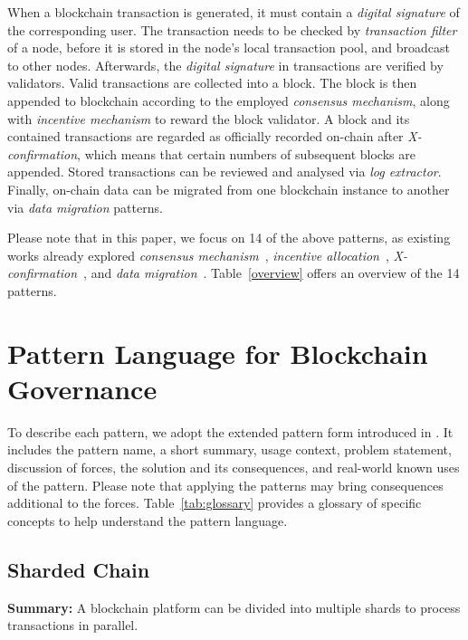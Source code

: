 \documentclass{article}
\begin{document}
When a blockchain transaction is generated, it must contain a \textit{digital signature} of the corresponding user. The transaction needs to be checked by \textit{transaction filter} of a node, before it is stored in the node's local transaction pool, and broadcast to other nodes. Afterwards, the \textit{digital signature} in transactions are verified by validators. Valid transactions are collected into a block. The block is then appended to blockchain according to the employed \textit{consensus mechanism}, along with \textit{incentive mechanism} to reward the block validator. A block and its contained transactions are regarded as officially recorded on-chain after \textit{X-confirmation}, which means that certain numbers of subsequent blocks are appended. Stored transactions can be reviewed and analysed via \textit{log extractor}. Finally, on-chain data can be migrated from one blockchain instance to another via \textit{data migration} patterns.

Please note that in this paper, we focus on 14 of the above patterns, as existing works already explored \textit{consensus mechanism}~\cite{consensus_survey, PoW_pattern}, \textit{incentive allocation}~\cite{liu2021defining}, \textit{X-confirmation}~\cite{xu2018pattern}, and \textit{data migration}~\cite{data_migration}. Table~\ref{overview} offers an overview of the 14 patterns.



\section{Pattern Language for Blockchain Governance}
\label{patterns}


To describe each pattern, we adopt the extended pattern form introduced in \cite{patternLanguage}. It includes the pattern name, a short summary, usage context, problem statement, discussion of forces, the solution and its consequences, and real-world known uses of the pattern. Please note that applying the patterns may bring consequences additional to the forces. Table~\ref{tab:glossary} provides a glossary of specific concepts to help understand the pattern language.




\subsection{Sharded Chain}

\vspace{0.5em}\noindent \textbf{Summary:} A blockchain platform can be divided into multiple shards to process transactions in parallel.
\end{document}
